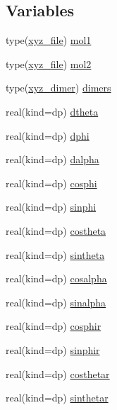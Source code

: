 \subsection*{Variables}
\begin{DoxyCompactItemize}
\item 
type(\hyperlink{structmod__read__xyz_1_1xyz__file}{xyz\+\_\+file}) \hyperlink{namespacemod__read__xyz_a4f9bfbc2e65fbc70f98f0dd5482a86f0}{mol1}
\item 
type(\hyperlink{structmod__read__xyz_1_1xyz__file}{xyz\+\_\+file}) \hyperlink{namespacemod__read__xyz_ad6455b07e3bcbb980fd81f7a6a61d835}{mol2}
\item 
type(\hyperlink{structmod__read__xyz_1_1xyz__dimer}{xyz\+\_\+dimer}) \hyperlink{namespacemod__read__xyz_aa013f111078e556f2e4eee9018cd605a}{dimers}
\item 
real(kind=dp) \hyperlink{namespacemod__read__xyz_a12174845302ad3f92b147b671045e952}{dtheta}
\item 
real(kind=dp) \hyperlink{namespacemod__read__xyz_a7d29c731d6db9ccacae5b6e2fb25f4c5}{dphi}
\item 
real(kind=dp) \hyperlink{namespacemod__read__xyz_a41a3fdae2ca35a3a22c0ed3bce4ab65f}{dalpha}
\item 
real(kind=dp) \hyperlink{namespacemod__read__xyz_a9ce51beca027f9eeb6aa61284b343add}{cosphi}
\item 
real(kind=dp) \hyperlink{namespacemod__read__xyz_a183d28b4e8d41fd8eefe9239450cb5f7}{sinphi}
\item 
real(kind=dp) \hyperlink{namespacemod__read__xyz_ae522e26e0e7e87987ca7018f36b43903}{costheta}
\item 
real(kind=dp) \hyperlink{namespacemod__read__xyz_af660cbed16517234379cfffe0132378f}{sintheta}
\item 
real(kind=dp) \hyperlink{namespacemod__read__xyz_a932bb57fc8636b50b040311a48f5f5ff}{cosalpha}
\item 
real(kind=dp) \hyperlink{namespacemod__read__xyz_a97d484f8583bf1d60e6d02230e28feb3}{sinalpha}
\item 
real(kind=dp) \hyperlink{namespacemod__read__xyz_a41be340f1c832ab4905f7e17f6ebe4ff}{cosphir}
\item 
real(kind=dp) \hyperlink{namespacemod__read__xyz_a446fc19de6fe61df592b2f68c8a86ca3}{sinphir}
\item 
real(kind=dp) \hyperlink{namespacemod__read__xyz_a4fe5cc70aa62a1a36598156d04828c90}{costhetar}
\item 
real(kind=dp) \hyperlink{namespacemod__read__xyz_ad3f08d13679d5f31c776b74f1abe0da5}{sinthetar}
\end{DoxyCompactItemize}


